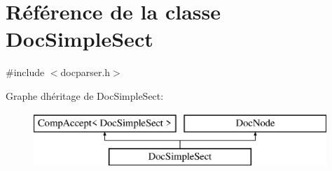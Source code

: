 \hypertarget{class_doc_simple_sect}{}\section{Référence de la classe Doc\+Simple\+Sect}
\label{class_doc_simple_sect}


{\ttfamily \#include $<$docparser.\+h$>$}

Graphe d\textquotesingle{}héritage de Doc\+Simple\+Sect\+:\begin{figure}[H]
\begin{center}
\leavevmode
\includegraphics[height=2.000000cm]{class_doc_simple_sect}
\end{center}
\end{figure}
